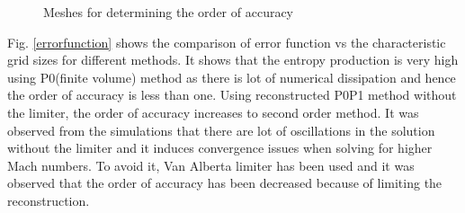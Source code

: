\documentclass[12pt]{elsarticle}
\begin{document}
	\begin{figure}[ht]
		\centering
		\caption{Meshes for determining the order of accuracy}
		\label{cylindergrid}
	\end{figure}
	\clearpage
	Fig. \ref{errorfunction} shows the comparison of error function vs the characteristic grid sizes for different methods. It shows that the entropy production is very high using P0(finite volume) method as there is lot of numerical dissipation and hence the order of accuracy is less than one. Using reconstructed P0P1 method without the limiter, the order of accuracy increases to second order method. It was observed from the simulations that there are lot of oscillations in the solution without the limiter and it induces convergence issues when solving for higher Mach numbers. To avoid it, Van Alberta limiter has been used and it was observed that the order of accuracy has been decreased because of limiting the reconstruction.
	
\end{document}

